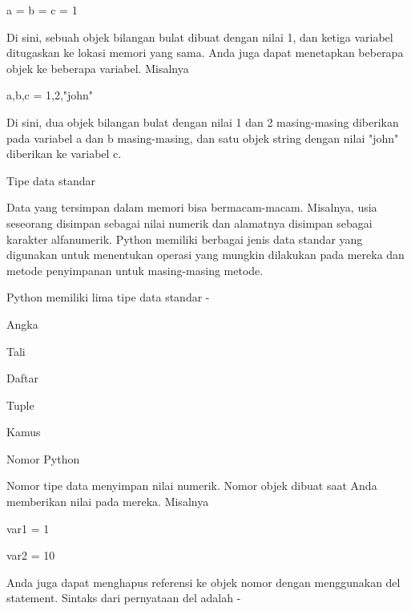 \noindent 
a = b = c = 1 \par
\vspace{12pt}
\noindent 
Di sini, sebuah objek bilangan bulat dibuat dengan nilai 1, dan ketiga variabel ditugaskan ke lokasi memori yang sama. $  $Anda juga dapat menetapkan beberapa objek ke beberapa variabel. $  $Misalnya  \par
\vspace{12pt}
\noindent 
a,b,c = 1,2,"john" \par
\vspace{12pt}
\noindent 
Di sini, dua objek bilangan bulat dengan nilai 1 dan 2 masing-masing diberikan pada variabel a dan b masing-masing, dan satu objek string dengan nilai "john" diberikan ke variabel c. \par
\vspace{12pt}
\noindent 
Tipe data standar \par
\vspace{12pt}
\noindent 
Data yang tersimpan dalam memori bisa bermacam-macam. $  $Misalnya, usia seseorang disimpan sebagai nilai numerik dan alamatnya disimpan sebagai karakter alfanumerik. $  $Python memiliki berbagai jenis data standar yang digunakan untuk menentukan operasi yang mungkin dilakukan pada mereka dan metode penyimpanan untuk masing-masing metode. \par
\vspace{12pt}
\noindent 
Python memiliki lima tipe data standar - \par
\vspace{12pt}
\noindent 
Angka \par
\noindent 
Tali \par
\noindent 
Daftar \par
\noindent 
Tuple \par
\noindent 
Kamus \par
\noindent 
Nomor Python \par
\vspace{12pt}
\noindent 
Nomor tipe data menyimpan nilai numerik. $  $Nomor objek dibuat saat Anda memberikan nilai pada mereka. $  $Misalnya  \par
\vspace{12pt}
\noindent 
var1 = 1 \par
\noindent 
var2 = 10 \par
\vspace{12pt}
\noindent 
Anda juga dapat menghapus referensi ke objek nomor dengan menggunakan del statement. $  $Sintaks dari pernyataan del adalah - \par
